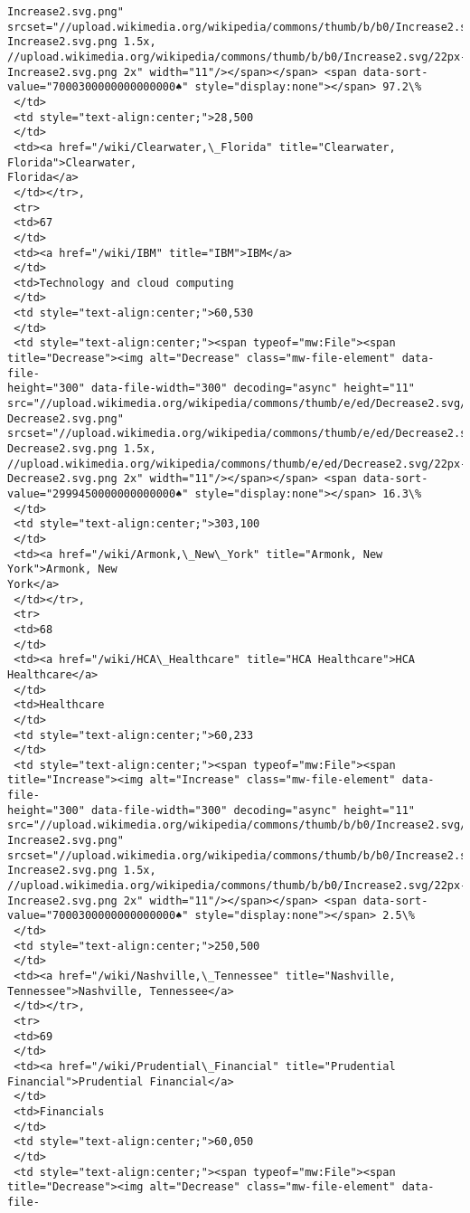\documentclass[11pt]{article}
\begin{document}
\begin{tcolorbox}[breakable, size=fbox, boxrule=.5pt, pad at break*=1mm, opacityfill=0]
\begin{Verbatim}[commandchars=\\\{\}]
Increase2.svg.png"
srcset="//upload.wikimedia.org/wikipedia/commons/thumb/b/b0/Increase2.svg/17px-
Increase2.svg.png 1.5x,
//upload.wikimedia.org/wikipedia/commons/thumb/b/b0/Increase2.svg/22px-
Increase2.svg.png 2x" width="11"/></span></span> <span data-sort-
value="7000300000000000000♠" style="display:none"></span> 97.2\%
 </td>
 <td style="text-align:center;">28,500
 </td>
 <td><a href="/wiki/Clearwater,\_Florida" title="Clearwater, Florida">Clearwater,
Florida</a>
 </td></tr>,
 <tr>
 <td>67
 </td>
 <td><a href="/wiki/IBM" title="IBM">IBM</a>
 </td>
 <td>Technology and cloud computing
 </td>
 <td style="text-align:center;">60,530
 </td>
 <td style="text-align:center;"><span typeof="mw:File"><span
title="Decrease"><img alt="Decrease" class="mw-file-element" data-file-
height="300" data-file-width="300" decoding="async" height="11"
src="//upload.wikimedia.org/wikipedia/commons/thumb/e/ed/Decrease2.svg/11px-
Decrease2.svg.png"
srcset="//upload.wikimedia.org/wikipedia/commons/thumb/e/ed/Decrease2.svg/17px-
Decrease2.svg.png 1.5x,
//upload.wikimedia.org/wikipedia/commons/thumb/e/ed/Decrease2.svg/22px-
Decrease2.svg.png 2x" width="11"/></span></span> <span data-sort-
value="2999450000000000000♠" style="display:none"></span> 16.3\%
 </td>
 <td style="text-align:center;">303,100
 </td>
 <td><a href="/wiki/Armonk,\_New\_York" title="Armonk, New York">Armonk, New
York</a>
 </td></tr>,
 <tr>
 <td>68
 </td>
 <td><a href="/wiki/HCA\_Healthcare" title="HCA Healthcare">HCA Healthcare</a>
 </td>
 <td>Healthcare
 </td>
 <td style="text-align:center;">60,233
 </td>
 <td style="text-align:center;"><span typeof="mw:File"><span
title="Increase"><img alt="Increase" class="mw-file-element" data-file-
height="300" data-file-width="300" decoding="async" height="11"
src="//upload.wikimedia.org/wikipedia/commons/thumb/b/b0/Increase2.svg/11px-
Increase2.svg.png"
srcset="//upload.wikimedia.org/wikipedia/commons/thumb/b/b0/Increase2.svg/17px-
Increase2.svg.png 1.5x,
//upload.wikimedia.org/wikipedia/commons/thumb/b/b0/Increase2.svg/22px-
Increase2.svg.png 2x" width="11"/></span></span> <span data-sort-
value="7000300000000000000♠" style="display:none"></span> 2.5\%
 </td>
 <td style="text-align:center;">250,500
 </td>
 <td><a href="/wiki/Nashville,\_Tennessee" title="Nashville,
Tennessee">Nashville, Tennessee</a>
 </td></tr>,
 <tr>
 <td>69
 </td>
 <td><a href="/wiki/Prudential\_Financial" title="Prudential
Financial">Prudential Financial</a>
 </td>
 <td>Financials
 </td>
 <td style="text-align:center;">60,050
 </td>
 <td style="text-align:center;"><span typeof="mw:File"><span
title="Decrease"><img alt="Decrease" class="mw-file-element" data-file-

\end{Verbatim}
\end{tcolorbox}
\end{document}
